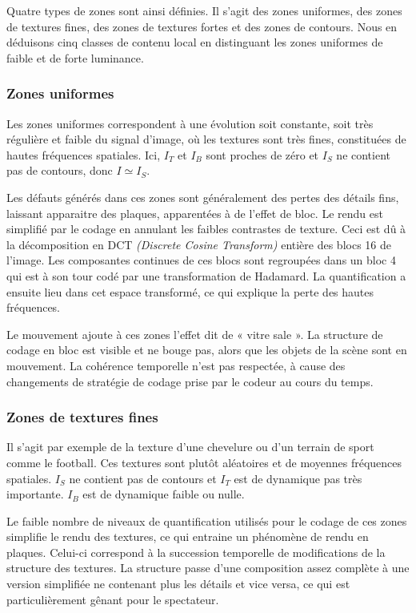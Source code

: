 Quatre types de zones sont ainsi définies. Il s'agit des zones uniformes, des zones de textures fines, des zones de textures fortes et des zones de contours. Nous en déduisons cinq classes de contenu local en distinguant les zones uniformes de faible et de forte luminance.


\subsubsection{Zones uniformes}
Les zones uniformes correspondent à une évolution soit constante, soit très régulière et faible du signal d'image, où les textures sont très fines, constituées de hautes fréquences spatiales. Ici, $I_T$ et $I_B$ sont proches de zéro et $I_S$ ne contient pas de contours, donc $I \simeq I_S$.

Les défauts générés dans ces zones sont généralement des pertes des détails fins, laissant apparaitre des plaques, apparentées à de l'effet de bloc. Le rendu est simplifié par le codage \avc{} en annulant les faibles contrastes de texture. Ceci est dû à la décomposition en DCT \emph{(Discrete Cosine Transform)} entière  des blocs 16 de l'image. Les composantes continues de ces blocs sont regroupées dans un bloc 4 qui est à son tour codé par une transformation de Hadamard. La quantification a ensuite lieu dans cet espace transformé, ce qui explique la perte des hautes fréquences.

Le mouvement ajoute à ces zones l'effet dit de « vitre sale ». La structure de codage en bloc est visible et ne bouge pas, alors que les objets de la scène sont en mouvement. La cohérence temporelle n'est pas respectée, à cause des changements de stratégie de codage prise par le codeur au cours du temps.


\subsubsection{Zones de textures fines}
Il s'agit par exemple de la texture d'une chevelure ou d'un terrain de sport comme le football. Ces textures sont plutôt aléatoires et de moyennes fréquences spatiales. $I_S$ ne contient pas de contours et $I_T$ est de dynamique pas très importante. $I_B$ est de dynamique faible ou nulle. %

Le faible nombre de niveaux de quantification utilisés pour le codage de ces zones simplifie le rendu des textures, ce qui entraine un phénomène de rendu en plaques. Celui-ci correspond à la succession temporelle de modifications de la structure des textures. La structure passe d'une composition assez complète à une version simplifiée ne contenant plus les détails et vice versa, ce qui est particulièrement gênant pour le spectateur.


